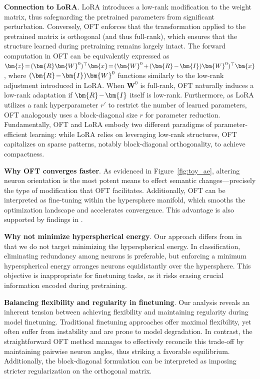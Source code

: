 \textbf{Connection to LoRA}. LoRA introduces a low-rank modification to the weight matrix, thus safeguarding the pretrained parameters from significant perturbation. Conversely, OFT enforces that the transformation applied to the pretrained matrix is orthogonal (and thus full-rank), which ensures that the structure learned during pretraining remains largely intact. The forward computation in OFT can be equivalently expressed as $\thickmuskip=2mu \medmuskip=2mu \bm{z}=(\bm{R}\bm{W}^0)^\top\bm{x}=(\bm{W}^0+(\bm{R}-\bm{I})\bm{W}^0)^\top\bm{x}$, where $\thickmuskip=2mu \medmuskip=2mu (\bm{R}-\bm{I})\bm{W}^0$ functions similarly to the low-rank adjustment introduced in LoRA. When $\bm{W}^0$ is full-rank, OFT naturally induces a low-rank adaptation if $\thickmuskip=2mu \medmuskip=2mu \bm{R}-\bm{I}$ itself is low-rank. Furthermore, as LoRA utilizes a rank hyperparameter $r'$ to restrict the number of learned parameters, OFT analogously uses a block-diagonal size $r$ for parameter reduction. Fundamentally, OFT and LoRA embody two different paradigms of parameter-efficient learning: while LoRA relies on leveraging low-rank structures, OFT capitalizes on sparse patterns, notably block-diagonal orthogonality, to achieve compactness.

\textbf{Why OFT converges faster}. As evidenced in Figure~\ref{fig:toy_ae}, altering neuron orientation is the most potent means to effect semantic changes—precisely the type of modification that OFT facilitates. Additionally, OFT can be interpreted as fine-tuning within the hypersphere manifold, which smooths the optimization landscape and accelerates convergence. This advantage is also supported by findings in \cite{liu2021orthogonal}.

\textbf{Why not minimize hyperspherical energy}. Our approach differs from \cite{liu2021orthogonal} in that we do not target minimizing the hyperspherical energy. In classification, eliminating redundancy among neurons is preferable, but enforcing a minimum hyperspherical energy arranges neurons equidistantly over the hypersphere. This objective is inappropriate for finetuning tasks, as it risks erasing crucial information encoded during pretraining.

\textbf{Balancing flexibility and regularity in finetuning}. Our analysis reveals an inherent tension between achieving flexibility and maintaining regularity during model finetuning. Traditional finetuning approaches offer maximal flexibility, yet often suffer from instability and are prone to model degradation. In contrast, the straightforward OFT method manages to effectively reconcile this trade-off by maintaining pairwise neuron angles, thus striking a favorable equilibrium. Additionally, the block-diagonal formulation can be interpreted as imposing stricter regularization on the orthogonal matrix.

